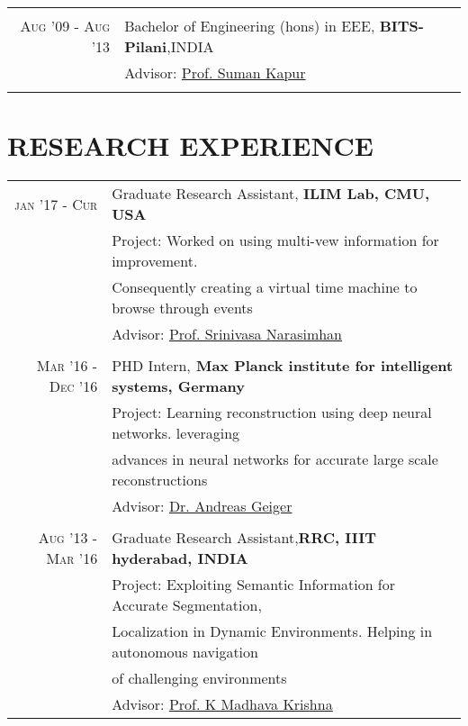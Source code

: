 \documentclass[7pt]{article}
\begin{document}
\begin{small}
\begin{tabular}{rl}
 \vspace{-2 mm}
&\\

\textsc{Aug} '09 - \textsc{Aug} '13 & Bachelor of Engineering (hons) in \textsc{EEE}, \normalsize\textbf{BITS-Pilani},INDIA\\
& 
\normalsize \small Advisor: 
\href{http://www.bits-pilani.ac.in/Hyderabad/sumankapur/Profile} {Prof. Suman Kapur }\\

 \vspace{-2 mm}
&\\

\end{tabular}

\vspace{-4 mm}

\section{RESEARCH EXPERIENCE} 
\begin{tabular}{rl}	
 \textsc{jan '17 - Cur} &  Graduate Research Assistant, \bf{ILIM Lab, CMU, USA}\\
 & Project: Worked on using multi-vew information for improvement. \\ & Consequently creating a virtual time machine to browse through events\\
 & \small Advisor: \href{http://www.cs.cmu.edu/~srinivas/} {Prof. Srinivasa Narasimhan} \\
 
 \vspace{-2 mm}
&\\

 \textsc{Mar '16 - Dec '16} &  PHD Intern,\bf{ Max Planck institute for intelligent systems, Germany}\\
& Project: Learning reconstruction using deep neural networks. leveraging \\   
&  advances in  neural networks for accurate large scale reconstructions\\
&\small Advisor: \href{http://www.cvlibs.net/} {Dr. Andreas Geiger} \\

 \vspace{-2 mm}
&\\

 \textsc{Aug '13 - Mar '16} &  Graduate Research Assistant,\bf{RRC, IIIT hyderabad, INDIA}\\
 & Project: Exploiting Semantic Information for Accurate Segmentation, \\ & Localization in  Dynamic Environments. Helping in autonomous navigation \\
 & of challenging environments \\
 &\normalsize  \small Advisor: \href{https://www.iiit.ac.in/people/faculty/mkrishna/} {Prof. K Madhava Krishna} \\
 

\end{tabular}
\end{small}
\end{document}
